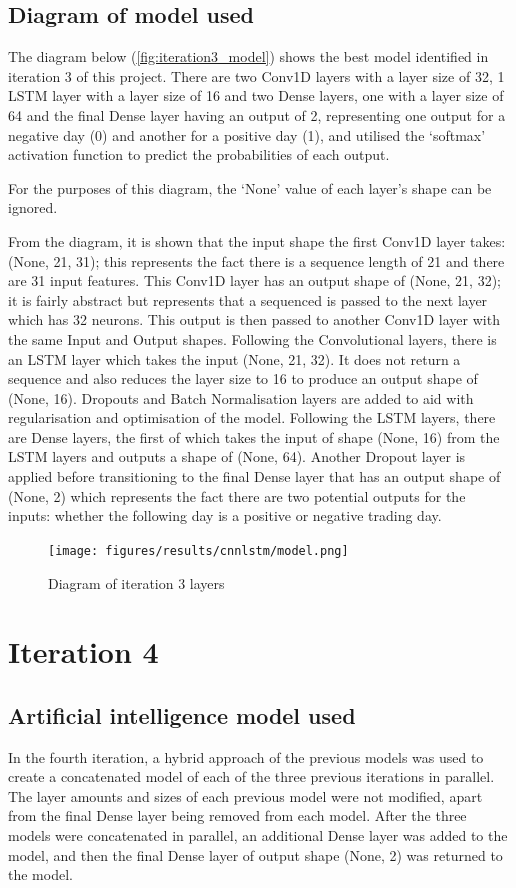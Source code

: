 \subsection{Diagram of model used}
The diagram below (\autoref{fig:iteration3_model}) shows the best model identified in iteration 3 of this project.
There are two Conv1D layers with a layer size of 32, 1 LSTM layer with a layer size of 16 and two Dense layers, one
with a layer size of 64 and the final Dense layer having an output of 2, representing one output for
a negative day (0) and another for a positive day (1), and utilised the `softmax' activation function to predict the
probabilities of each output.

For the purposes of this diagram, the `None' value of each layer's shape can be ignored.

From the diagram, it is shown that the input shape the first Conv1D layer takes: (None, 21, 31); this represents the
fact there is a sequence length of 21 and there are 31 input features.  This Conv1D layer has an output shape of (None, 21, 32); it is fairly abstract
but represents that a sequenced is passed to the next layer which has 32 neurons. This output is then passed to another
Conv1D layer with the same Input and Output shapes. Following the Convolutional layers, there is an LSTM layer
which takes the input (None, 21, 32). It does not return a sequence and also reduces the layer size to 16 to produce an
output shape of (None, 16). Dropouts and Batch Normalisation layers are added to aid with regularisation and optimisation of the model.
Following the LSTM layers, there are Dense layers, the first of which takes the input of shape (None, 16) from the
LSTM layers and outputs a shape of (None, 64). Another Dropout layer is applied before transitioning to the final Dense layer that has an output shape of (None, 2)
which represents the fact there are two potential outputs for the inputs: whether the following day
is a positive or negative trading day.

\begin{figure}[ht]
    \centering
    \texttt{[image: figures/results/cnnlstm/model.png]}
    \caption[Diagram of iteration 3 layers]{Diagram of iteration 3 layers}
    \label{fig:iteration3_model}
\end{figure}
\FloatBarrier

\section{Iteration 4}
\subsection{Artificial intelligence model used}\label{ssec:iteration4_ai_model}
In the fourth iteration, a hybrid approach of the previous models was used to create a concatenated model of each
of the three previous iterations in parallel. The layer amounts and sizes of each previous model were not modified, apart from
the final Dense layer being removed from each model. After the three models were concatenated in parallel,
an additional Dense layer was added to the model, and then the final Dense layer of output shape (None, 2) was returned to the model.

